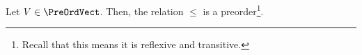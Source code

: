 %
%
\label {ex: properties of the order on a preordered vector space}Let $V \in \PreOrdVect$. Then, the relation $\leq$ is a preorder\footnote{Recall that this means it is reflexive and transitive.}.

